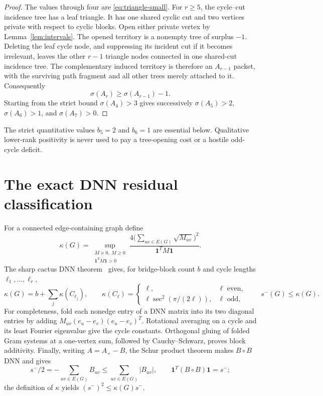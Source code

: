 \documentclass[11pt]{article}
\newcommand{\smE}{s^-}
\newcommand{\sig}{\sigma}
\newcommand{\one}{\mathbf 1}
\begin{document}
\begin{proof}
The values through four are \eqref{eq:triangle-small}.  For $r\geq5$, the
cycle--cut incidence tree has a leaf triangle.  It has one shared cyclic cut
and two vertices private with respect to cyclic blocks.  Open either private
vertex by Lemma~\ref{lem:intervals}.  The opened territory is a nonempty tree
of surplus $-1$.  Deleting the leaf cycle node, and suppressing its incident
cut if it becomes irrelevant, leaves the other $r-1$ triangle nodes connected
in one shared-cut incidence tree.  The complementary induced territory is
therefore an $A_{r-1}$ packet, with the surviving path fragment and all other
trees merely attached to it.  Consequently
\[
 \sig(A_r)\geq\sig(A_{r-1})-1.
\]
Starting from the strict bound $\sig(A_4)>3$ gives successively
$\sig(A_5)>2$, $\sig(A_6)>1$, and $\sig(A_7)>0$.
\end{proof}

The strict quantitative values $b_5=2$ and $b_6=1$ are essential below.
Qualitative lower-rank positivity is never used to pay a tree-opening cost or
a hostile odd-cycle deficit.

\section{The exact DNN residual classification}

For a connected edge-containing graph define
\[
 \kappa(G)=\sup_{\substack{M\succeq0,\ M\geq0\\\one^TM\one>0}}
 \frac{4\bigl(\sum_{uv\in E(G)}\sqrt{M_{uv}}\bigr)^2}
      {\one^TM\one}.
\]
The sharp cactus DNN theorem~\cite{DNN,LTZ} gives, for bridge-block count $b$
and cycle lengths $\ell_1,\ldots,\ell_r$,
\begin{equation}\label{eq:kappa}
 \kappa(G)=b+\sum_j\kappa(C_{\ell_j}),
 \qquad
 \kappa(C_\ell)=
 \begin{cases}
  \ell,&\ell\text{ even},\\
  \ell\sec^2(\pi/(2\ell)),&\ell\text{ odd},
 \end{cases}
 \qquad \smE(G)\leq\kappa(G).
\end{equation}
For completeness, fold each nonedge entry of a DNN matrix into its two
diagonal entries by adding $M_{uv}(e_u-e_v)(e_u-e_v)^T$.  Rotational averaging
on a cycle and its least Fourier eigenvalue give the cycle constants.
Orthogonal gluing of folded Gram systems at a one-vertex sum, followed by
Cauchy--Schwarz, proves block additivity.  Finally, writing $A=A_+-B$, the
Schur product theorem makes $B\circ B$ DNN and gives
\[
 \smE/2=-\sum_{uv\in E(G)}B_{uv}\leq\sum_{uv\in E(G)}|B_{uv}|,
 \qquad \one^T(B\circ B)\one=\smE;
\]
the definition of $\kappa$ yields $(\smE)^2\leq\kappa(G)\smE$.
\end{document}
